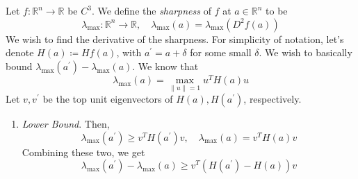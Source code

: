 	\begin{example}
		Let $f: \mathbb{R}^n \to \mathbb{R}$ be $C^3$. We define the \textit{sharpness} of $f$ at $a \in \mathbb{R}^n$ to be 
		\begin{equation}
			\lambda_{\max}: \mathbb{R}^n \to \mathbb{R}, \quad \lambda_{\max}(a) = \lambda_{\max}(D^2f(a))
		\end{equation}
		We wish to find the derivative of the sharpness. For simplicity of notation, let's denote $H(a) \coloneqq Hf(a)$, with $a^\prime = a + \delta$ for some small $\delta$. We wish to basically bound $\lambda_{\max} (a^\prime) - \lambda_{\max} (a)$. We know that 
		\begin{equation}
			\lambda_{\max} (a) = \max_{\|u\| = 1} u^T H(a) u 
		\end{equation}
		Let $v, v^\prime$ be the top unit eigenvectors of $H(a), H(a^\prime)$, respectively. 
		\begin{enumerate}
		  \item \textit{Lower Bound}. Then, 
				\begin{equation}
					\lambda_{\max} (a^\prime) \geq v^T H(a^\prime) v, \quad \lambda_{\max} (a) = v^T H(a) v
				\end{equation}
				Combining these two, we get 
				\begin{equation}
					\lambda_{\max}(a^\prime) - \lambda_{\max} (a) \geq v^T (H(a^\prime) - H(a)) v
				\end{equation}


\end{enumerate}
\end{example}
